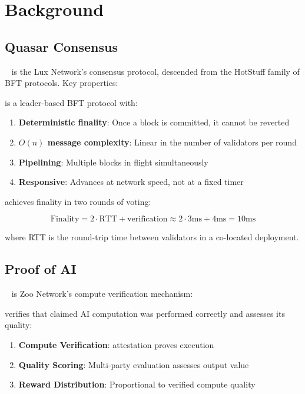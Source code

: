 \section{Background}


\subsection{Quasar Consensus}

\Quasar{}~\cite{lux-quasar-consensus} is the Lux Network's consensus protocol, descended from the HotStuff family of BFT protocols. Key properties:

\begin{definition}
\Quasar{} is a leader-based BFT protocol with:
\begin{enumerate}
    \item \textbf{Deterministic finality}: Once a block is committed, it cannot be reverted
    \item \textbf{$O(n)$ message complexity}: Linear in the number of validators per round
    \item \textbf{Pipelining}: Multiple blocks in flight simultaneously
    \item \textbf{Responsive}: Advances at network speed, not at a fixed timer
\end{enumerate}
\end{definition}

\Quasar{} achieves finality in two rounds of voting:

\begin{equation}
\text{Finality} = 2 \cdot \text{RTT} + \text{verification} \approx 2 \cdot 3\text{ms} + 4\text{ms} = 10\text{ms}
\end{equation}

where RTT is the round-trip time between validators in a co-located deployment.

\subsection{Proof of AI}

\PoAI{}~\cite{zoo-poai-consensus} is Zoo Network's compute verification mechanism:

\begin{definition}[Proof of AI]
\PoAI{} verifies that claimed AI computation was performed correctly and assesses its quality:
\begin{enumerate}
    \item \textbf{Compute Verification}: \TEE{} attestation proves execution
    \item \textbf{Quality Scoring}: Multi-party evaluation assesses output value
    \item \textbf{Reward Distribution}: Proportional to verified compute quality
\end{enumerate}
\end{definition}

